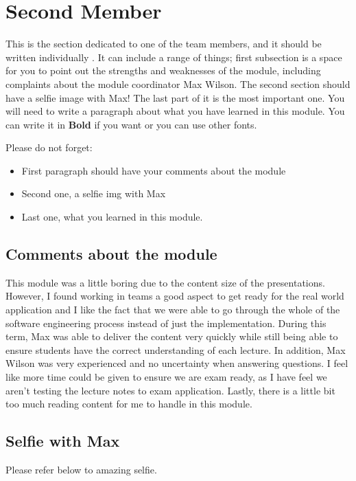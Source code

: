 \section{Second Member}
This is the section dedicated to one of the team members, and it should be written individually . It can include a range of things; first subsection is a space for you to point out the strengths and weaknesses of the module, including complaints about the module coordinator Max Wilson. The second section should have a selfie image with Max! The last part of it is the most important one. You will need to write a paragraph about what you have learned in this module. You can write it in \textbf{Bold} if you want or you can use other fonts. 



Please do not forget:
\begin{itemize}
	\item First paragraph should have your comments about the module
	\item Second one, a selfie img with Max
	\item Last one, what you learned in this module.
\end{itemize}

\subsection{Comments about the module}
This module was a little boring due to the content size of the presentations. However, I found working in teams a good aspect to get ready for the real world application and I like the fact that we were able to go through the whole of the software engineering process instead of just the implementation. During this term, Max was able to deliver the content very quickly while still being able to ensure students have the correct understanding of each lecture. In addition, Max Wilson was very experienced and no uncertainty when answering questions. I feel like more  time could be given to ensure we are exam ready, as I have feel we aren't testing the lecture notes to exam application. Lastly, there is a little bit too much reading content for me to handle in this module.

\subsection{Selfie with Max}

Please refer below to amazing selfie.

